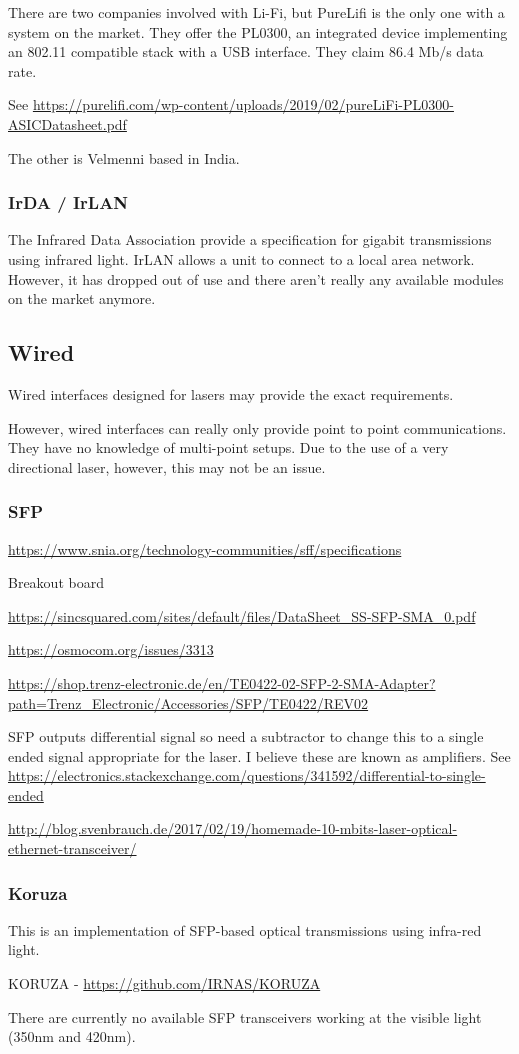 \documentclass{article}
\begin{document}
There are two companies involved with Li-Fi, but PureLifi is the only one with a system on the market. They offer the PL0300, an integrated device implementing an 802.11 compatible stack with a USB interface. They claim 86.4 Mb/s data rate.

See \url{https://purelifi.com/wp-content/uploads/2019/02/pureLiFi-PL0300-ASICDatasheet.pdf}

The other is Velmenni based in India.

\subsubsection{IrDA / IrLAN}
The Infrared Data Association provide a specification for gigabit transmissions using infrared light. IrLAN allows a unit to connect to a local area network. However, it has dropped out of use and there aren't really any available modules on the market anymore.

\subsection{Wired}
Wired interfaces designed for lasers may provide the exact requirements.

However, wired interfaces can really only provide point to point communications. They have no knowledge of multi-point setups. Due to the use of a very directional laser, however, this may not be an issue.

\subsubsection{\ac{SFP}}

\url{https://www.snia.org/technology-communities/sff/specifications}

Breakout board

\url{https://sincsquared.com/sites/default/files/DataSheet_SS-SFP-SMA_0.pdf}

\url{https://osmocom.org/issues/3313}

\url{https://shop.trenz-electronic.de/en/TE0422-02-SFP-2-SMA-Adapter?path=Trenz_Electronic/Accessories/SFP/TE0422/REV02}

\ac{SFP} outputs differential signal so need a subtractor to change this to a single ended signal appropriate for the laser. I believe these are known as amplifiers. See \url{https://electronics.stackexchange.com/questions/341592/differential-to-single-ended}

\url{http://blog.svenbrauch.de/2017/02/19/homemade-10-mbits-laser-optical-ethernet-transceiver/}

\subsubsection{Koruza}
This is an implementation of \ac{SFP}-based optical transmissions using infra-red light.

KORUZA - \url{https://github.com/IRNAS/KORUZA}

There are currently no available \ac{SFP} transceivers working at the visible light (350nm and 420nm).



\end{document}
